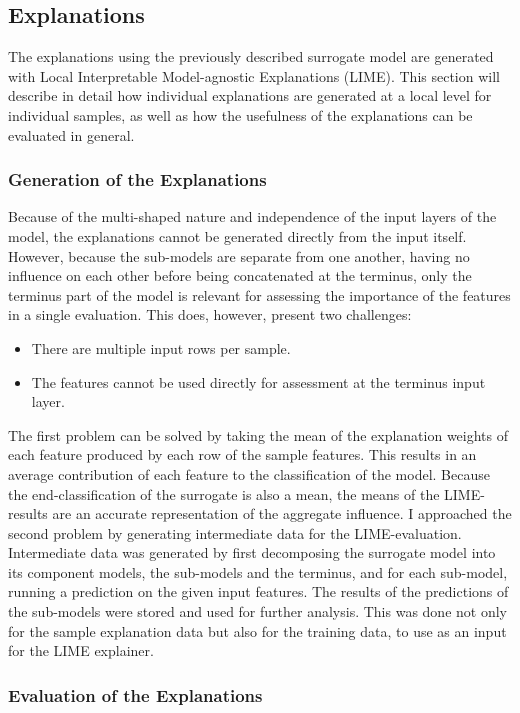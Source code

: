 \documentclass{article}
\begin{document}
		\subsection{Explanations}
		The explanations using the previously described surrogate model are generated with Local
		Interpretable Model-agnostic Explanations (LIME). This section will describe in detail how
		individual explanations are generated at a local level for individual samples, as well as
		how the usefulness of the explanations can be evaluated in general.
			\subsubsection{Generation of the Explanations}
			Because of the multi-shaped nature and independence of the input layers of the model,
			the explanations cannot be generated directly from the input itself. However, because
			the sub-models are separate from one another, having no influence on each other before
			being concatenated at the terminus, only the terminus part of the model is relevant
			for assessing the importance of the features in a single evaluation. This does,
			however, present two challenges:
			\begin{itemize}
				\item There are multiple input rows per sample.
				\item The features cannot be used directly for assessment at the terminus input
					layer.
			\end{itemize}
			The first problem can be solved by taking the mean of the explanation weights of each
			feature produced by each row of the sample features. This results in an average
			contribution of each feature to the classification of the model. Because the
			end-classification of the surrogate is also a mean, the means of the LIME-results are
			an accurate representation of the aggregate influence.
			\newline
			I approached the second problem by generating intermediate data for the
			LIME-evaluation. Intermediate data was generated by first decomposing the surrogate
			model into its component models, the sub-models and the terminus, and for each
			sub-model, running a prediction on the given input features. The results of the
			predictions of the sub-models were stored and used for further analysis. This was done
			not only for the sample explanation data but also for the training data, to use as an
			input for the LIME explainer.
			\subsubsection{Evaluation of the Explanations}
\end{document}
